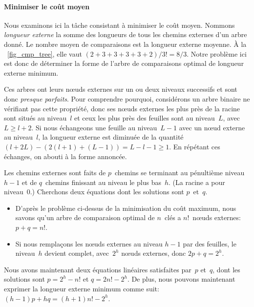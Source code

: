 \paragraph{Minimiser le coût moyen}
\label{par_opt_sort_minimean}

Nous examinons ici la tâche consistant à minimiser le coût
moyen. Nommons \emph{longueur
  externe}\label{sorting__external_path_length}  la somme des longueurs de tous les chemins
externes d'un arbre donné. Le nombre moyen de comparaisons est la
longueur externe moyenne. À la \fig~\vref{fig_cmp_tree}, elle vaut
\((2+3+3+3+3+2)/3!=8/3\). Notre problème ici est donc de déterminer la
forme de l'arbre de comparaisons optimal de longueur externe minimum.

Ces arbres ont leurs n{\oe}uds externes sur un ou deux niveaux
successifs et sont donc \emph{presque parfaits}. Pour comprendre pourquoi,
considérons un arbre binaire ne vérifiant pas cette propriété, donc
ses n{\oe}uds externes les plus près de la racine sont situés au
niveau~\(l\) et ceux les plus près des feuilles sont au niveau~\(L\),
avec \(L \geqslant l + 2\). Si nous échangeons une feuille au
niveau~\(L-1\) avec un n{\oe}ud externe au niveau~\(l\), la longueur
externe est diminuée de la quantité \((l+2L) - (2(l+1) + (L-1)) = L -
l - 1 \geqslant 1\). En répétant ces échanges, on abouti à la forme
annoncée.

Les chemins externes sont faits de \(p\)~chemins se terminant au
pénultième niveau~\(h-1\) et de \(q\)~chemins finissant au niveau le
plus bas~\(h\). (La racine a pour niveau~\(0\).) Cherchons deux
équations dont les solutions sont \(p\)~et~\(q\).
\begin{itemize}

  \item D'après le problème ci-dessus de la minimisation du coût
    maximum, nous savons qu'un arbre de comparaison optimal de
    \(n\)~clés a \(n!\)~n{\oe}uds externes: \(p+q=n!\).

  \item Si nous remplaçons les n{\oe}uds externes au niveau \(h-1\)
    par des feuilles, le niveau~\(h\) devient complet, avec~\(2^h\)
    n{\oe}uds externes, donc \(2p+q=2^h\).

\end{itemize}
Nous avons maintenant deux équations linéaires satisfaites par~\(p\)
et~\(q\), dont les solutions sont \(p=2^h-n!\) et \(q=2n!-2^h\). De
plus, nous pouvons maintenant exprimer la longueur externe minimum
comme suit: \((h-1)p + hq = (h+1)n! - 2^h\).

